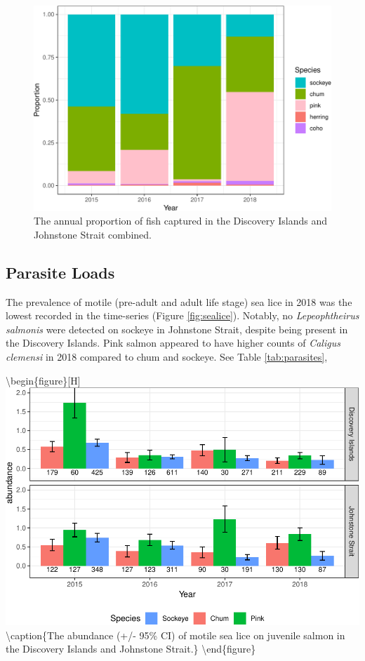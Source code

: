 \documentclass[fleqn,10pt]{wlpeerj} %
\begin{document}
\begin{figure}[H]
\includegraphics[width=0.8\linewidth]{peer_j_migration_dynamics_files/figure-latex/prop-1} \caption{The annual proportion of fish captured in the Discovery Islands and Johnstone Strait combined.}\label{fig:prop}
\end{figure}

\subsection*{Parasite Loads}\label{parasite-loads}

The prevalence of motile (pre-adult and adult life stage) sea lice in
2018 was the lowest recorded in the time-series (Figure
\ref{fig:sealice}). Notably, no \emph{Lepeophtheirus salmonis} were
detected on sockeye in Johnstone Strait, despite being present in the
Discovery Islands. Pink salmon appeared to have higher counts of
\emph{Caligus clemensi} in 2018 compared to chum and sockeye. See Table
\ref{tab:parasites},

\textbackslash{}begin\{figure\}{[}H{]}
\includegraphics[width=0.8\linewidth]{peer_j_migration_dynamics_files/figure-latex/sealice-1}
\textbackslash{}caption\{The abundance (+/- 95\% CI) of motile sea lice
on juvenile salmon in the Discovery Islands and Johnstone
Strait.\}\label{fig:sealice} \textbackslash{}end\{figure\}
\end{document}
